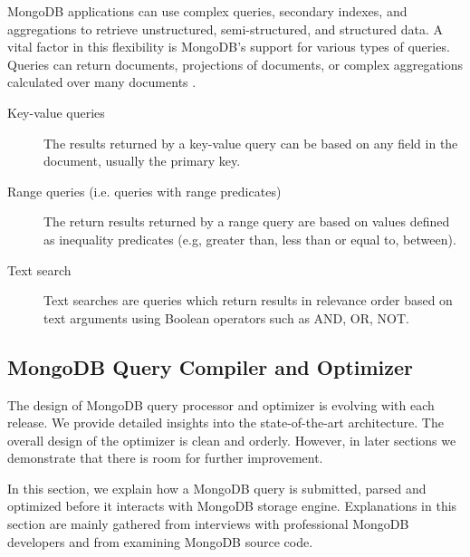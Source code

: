 MongoDB applications can use complex queries, secondary indexes, and 
aggregations to retrieve unstructured, semi-structured, and structured data. A vital factor in this flexibility is MongoDB's support for various  types of queries. Queries can return documents, projections of documents, or complex aggregations calculated over
many documents \cite{mongodb_2019}.

\begin{description}
     \item[Key-value queries]  The results returned by a key-value
     query can be based on any field in the document, usually the 
     primary key.
     \item[Range queries (i.e. queries with range predicates)] The
     return results returned by a range query are based on values 
     defined as inequality predicates (e.g, greater than, less than or 
     equal to, between).
     \item[Text search] Text searches are queries which return 
     results in relevance order based on text arguments using
     Boolean operators such as AND, OR, NOT.
\end{description}

\subsection{MongoDB Query Compiler and Optimizer}
The design of MongoDB query processor and optimizer is evolving with each release. We provide detailed insights into the state-of-the-art architecture. The overall design of the optimizer  is clean and orderly. However, in later sections we demonstrate that there is room for further improvement.

In this section, we explain how a MongoDB query is submitted, parsed and optimized before it interacts with MongoDB storage engine. Explanations in this section are mainly gathered from interviews with professional MongoDB developers and from examining MongoDB source code.

